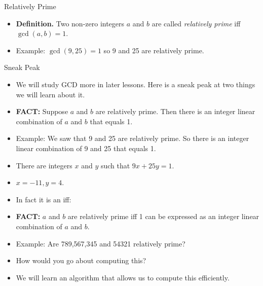 \documentclass{beamer}
\begin{document}
\begin{frame}{Relatively Prime}

\begin{itemize}
  \item \textbf{Definition.} Two non-zero integers $a$ and $b$ are called
  \emph{relatively prime} iff $\gcd(a,b)=1$.
  \item Example: $\gcd(9,25) = 1$ so 9 and 25 are relatively prime.
\end{itemize}

\end{frame}

\begin{frame}{Sneak Peak}

\begin{itemize}
  \item We will study GCD more in later lessons. Here is a sneak peak at two
  things we will learn about it.
  \item \textbf{FACT:} Suppose $a$ and $b$ are relatively prime. Then there
  is an integer linear combination of $a$ and $b$ that equals 1.
  \item  Example: We saw that 9 and 25 are relatively prime. So there is an
  integer linear combination of 9 and 25 that equals 1.
  \item There are integers $x$ and $y$ such that $9x + 25y = 1$.
  \item $x=-11, y=4$.
  \item In fact it is an iff:
  \item \textbf{FACT:} $a$ and $b$ are relatively prime iff 1 can be expressed
  as an integer linear combination of $a$ and $b$.
  \item Example: Are 789,567,345 and 54321 relatively prime?
  \item How would you go about computing this?
  \item We will learn an algorithm that allows us to compute this efficiently.
\end{itemize}

\end{frame}
\end{document}
